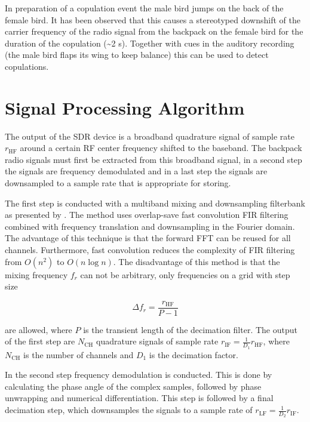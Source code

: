 \documentclass[10pt]{article}
\let\cite\citep
\providecommand\citet{\cite}
\providecommand\citep{\cite}
\begin{document}
In preparation of a copulation event the male bird jumps on the back of
the female bird. It has been observed that this causes a stereotyped
downshift of the carrier frequency of the radio signal from the backpack
on the female bird for the duration of the copulation
(\textasciitilde{}2 s). Together with cues in the auditory recording
(the male bird flaps its wing to keep balance) this can be used to
detect copulations.

\section{Signal Processing Algorithm} \label{Signal_Processing_Algorithm}
The output of the SDR device is a broadband quadrature signal of sample rate $r_\text{HF}$ around a certain RF center frequency shifted to the baseband. The backpack radio signals must first be extracted from this broadband signal, in a second step the signals are frequency demodulated and in a last step the signals are downsampled to a sample rate that is appropriate for storing.

The first step is conducted with a multiband mixing and downsampling filterbank as presented by \citet{Borgerding_2006}. The method uses overlap-save fast convolution FIR filtering combined with frequency translation and downsampling in the Fourier domain. The advantage of this technique is that the forward FFT can be reused for all channels. Furthermore, fast convolution reduces the complexity of FIR filtering from $O(n^2)$ to $O(n\log{}n)$. The disadvantage of this method is that the mixing frequency $f_r$ can not be arbitrary, only frequencies on a grid with step size

\begin{equation}
\Delta f_r = \frac{r_\text{HF}}{P-1}
\end{equation}

are allowed, where $P$ is the transient length of the decimation filter. The output of the first step are $N_\text{CH}$ quadrature signals of sample rate $r_\text{IF} = \frac{1}{D_1} r_\text{HF}$, where $N_\text{CH}$ is the number of channels and $D_1$ is the decimation factor.

In the second step frequency demodulation is conducted. This is done by calculating the phase angle of the complex samples, followed by phase unwrapping and numerical differentiation. This step is followed by a final decimation step, which downsamples the signals to a sample rate of $r_\text{LF} = \frac{1}{D_2} r_\text{IF}$.
\end{document}
